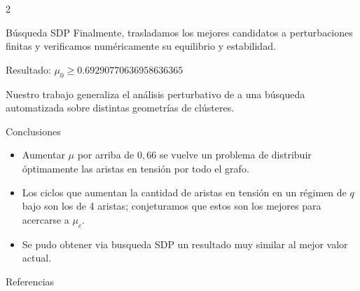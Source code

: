 \documentclass[12pt]{article}
\newcommand{\bodyfont}{%
  \normalfont\fontsize{30}{40}\selectfont
}
\begin{document}
\begin{multicols*}{2}
\begin{borderbox}{Búsqueda SDP}
Finalmente, trasladamos los mejores candidatos a perturbaciones finitas y verificamos numéricamente su equilibrio y estabilidad.

\begin{center}
    Resultado: \(\boxed{\mu_0 \geq 0.69290770636958636365}\)
\end{center}

Nuestro trabajo generaliza el análisis perturbativo de \cite{okeeffe20261116densekuramotonetworks} a una búsqueda automatizada sobre distintas geometrías de clústeres.

\end{borderbox}

\begin{filledbox}{Conclusiones}
    \begin{itemize}
        \item Aumentar \(\mu\) por arriba de \(0,66\) se vuelve un problema de distribuir óptimamente las aristas en tensión por todo el grafo.
        \item Los ciclos que aumentan la cantidad de aristas en tensión en un régimen de \(q\) bajo son los de 4 aristas; conjeturamos que estos son los mejores para acercarse a \(\mu_c\).
        \item Se pudo obtener via busqueda SDP un resultado muy similar al mejor valor actual.
    \end{itemize}
\end{filledbox}

\begin{unfilledbox}{Referencias}
    \renewcommand{\bibsection}{}
    
    \bodyfont
    
    \setlength{\bibsep}{10pt}
    
    
\end{unfilledbox}

\end{multicols*}
\end{document}
